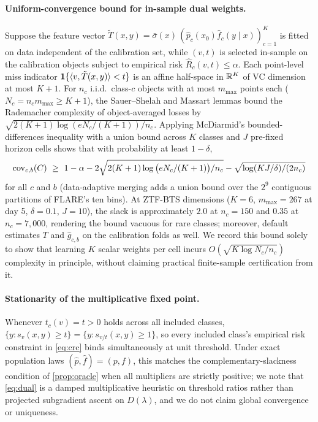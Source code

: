\paragraph{Uniform-convergence bound for in-sample dual weights.}
Suppose the feature vector $\tilde T(x,y)=\bar\sigma(x)\,(\hat p_c(x_0)\hat f_c(y\mid x))_{c=1}^K$ is fitted on data independent of the calibration set, while $(v,t)$ is selected in-sample on the calibration objects subject to empirical risk $\hat R_c(v,t)\le\alpha$.
Each point-level miss indicator $\mathbf{1}\{\langle v,\tilde T(x,y)\rangle<t\}$ is an affine half-space in $\mathbb{R}^K$ of VC dimension at most $K+1$.
For $n_c$ i.i.d.\ class-$c$ objects with at most $m_{\max}$ points each ($N_c=n_c m_{\max}\ge K+1$), the Sauer--Shelah and Massart lemmas bound the Rademacher complexity of object-averaged losses by $\sqrt{2(K+1)\log(eN_c/(K+1))/n_c}$.
Applying McDiarmid's bounded-differences inequality \citep[Thm.~3.3]{mohri2018foundations} with a union bound across $K$ classes and $J$ pre-fixed horizon cells shows that with probability at least $1-\delta$,
\[
\cov_{c,b}(C)\ \ge\ 1-\alpha-2\sqrt{2(K+1)\log\big(eN_c/(K+1)\big)/n_c}-\sqrt{\log(KJ/\delta)/(2n_c)}
\]
for all $c$ and $b$ (data-adaptive merging adds a union bound over the $2^9$ contiguous partitions of FLARE's ten bins).
At ZTF-BTS dimensions ($K=6$, $m_{\max}=267$ at day 5, $\delta=0.1$, $J=10$), the slack is approximately $2.0$ at $n_c=150$ and $0.35$ at $n_c=7{,}000$, rendering the bound vacuous for rare classes; moreover, default \gamut{} estimates $T$ and $\hat g_{c,b}$ on the calibration folds as well.
We record this bound solely to show that learning $K$ scalar weights per cell incurs $O(\sqrt{K\log N_c/n_c})$ complexity in principle, without claiming practical finite-sample certification from it.

\paragraph{Stationarity of the multiplicative fixed point.}
Whenever $t_c(v)=t>0$ holds across all included classes, $\{y:s_v(x,y)\ge t\}=\{y:s_{v/t}(x,y)\ge 1\}$, so every included class's empirical risk constraint in \cref{eq:crc} binds simultaneously at unit threshold.
Under exact population laws $(\hat p,\hat f)=(p,f)$, this matches the complementary-slackness condition of \cref{prop:oracle} when all multipliers are strictly positive; we note that \cref{eq:dual} is a damped multiplicative heuristic on threshold ratios rather than projected subgradient ascent on $D(\lambda)$, and we do not claim global convergence or uniqueness.
